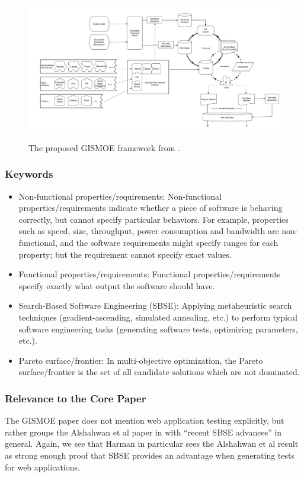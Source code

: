 \documentclass{sig-alternate-05-2015}
\begin{document}
\begin{figure}[!h]
\centering
\includegraphics[width=7in]{images/gismoe.png}
\label{fig:gismoe}
\caption{The proposed GISMOE framework from \cite{harman2012gismoe}.}
\end{figure}

\subsubsection{Keywords}

\begin{itemize}
\item Non-functional properties/requirements: Non-functional properties/requirements indicate whether a piece of software is behaving correctly, but cannot specify particular behaviors. For example, properties such as speed, size, throughput, power consumption and bandwidth are non-functional, and the software requirements might specify ranges for each property; but the requirement cannot specify exact values.
\item Functional properties/requirements: Functional properties/requirements specify exactly what output the software should have.
\item Search-Based Software Engineering (SBSE): Applying metaheuristic search techniques (gradient-ascending, simulated annealing, etc.) to perform typical software engineering tasks (generating software tests, optimizing parameters, etc.).
\item Pareto surface/frontier: In multi-objective optimization, the Pareto surface/frontier is the set of all candidate solutions which are not dominated.
\end{itemize}

\subsubsection{Relevance to the Core Paper}
The GISMOE paper does not mention web application testing explicitly, but rather groups the Alshahwan et al paper in with ``recent SBSE advances'' in general. Again, we see that Harman in particular sees the Alshahwan et al result as strong enough proof that SBSE provides an advantage when generating tests for web applications. 
\end{document}
